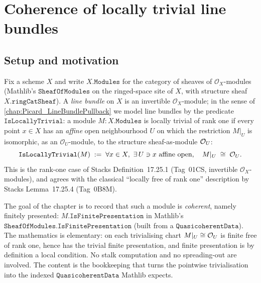 \chapter{Coherence of locally trivial line bundles}
\label{chap:Picard_LineBundleCoherence}


\section{Setup and motivation}
\label{sec:lbc_setup}

Fix a scheme \(X\) and write \(X.\mathtt{Modules}\) for the category of sheaves
of \(\mathcal{O}_X\)-modules (Mathlib's \(\mathtt{SheafOfModules}\) on the
ringed-space site of \(X\), with structure sheaf \(X.\mathtt{ringCatSheaf}\)).
A \emph{line bundle} on \(X\) is an invertible \(\mathcal{O}_X\)-module; in the
sense of \cref{chap:Picard_LineBundlePullback} we model line bundles by the
predicate \(\texttt{IsLocallyTrivial}\): a module \(M : X.\mathtt{Modules}\) is locally
trivial of rank one if every point \(x \in X\) has an \emph{affine} open
neighbourhood \(U\) on which the restriction \(M|_U\) is isomorphic, as an
\(\mathcal{O}_U\)-module, to the structure sheaf-as-module \(\mathcal{O}_{U}\):
\[
  \texttt{IsLocallyTrivial}(M) \;:=\;
  \forall x \in X,\ \exists\, U \ni x \text{ affine open},\quad
  M|_U \;\cong\; \mathcal{O}_{U}.
\]
This is the rank-one case of Stacks Definition~17.25.1
(Tag~01CS, invertible \(\mathcal{O}_X\)-modules), and
agrees with the classical ``locally free of rank one'' description by Stacks
Lemma~17.25.4 (Tag~0B8M).

The goal of the chapter is to record that such a module is \emph{coherent},
namely finitely presented:
\(M.\mathtt{IsFinitePresentation}\) in Mathlib's
\(\mathtt{SheafOfModules.IsFinitePresentation}\) (built from a
\(\mathtt{QuasicoherentData}\)). The mathematics is elementary: on each
trivialising chart \(M|_U \cong \mathcal{O}_{U}\) is finite free of rank one, hence
has the trivial finite presentation, and finite presentation is by definition a
local condition. No stalk computation and no spreading-out are involved. The
content is the bookkeeping that turns the pointwise trivialisation into the
indexed \(\mathtt{QuasicoherentData}\) Mathlib expects.

